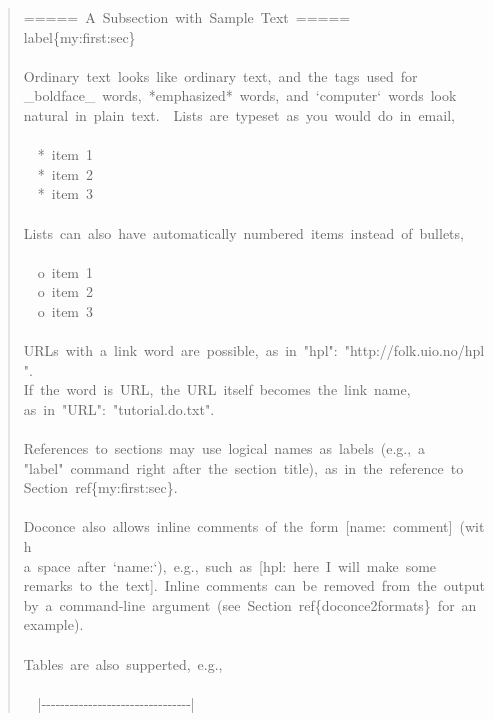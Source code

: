 \documentclass[a4paper]{article}
\begin{document}
\begin{quote}{\ttfamily \raggedright \noindent
=====~A~Subsection~with~Sample~Text~=====\\
label\{my:first:sec\}\\
~\\
Ordinary~text~looks~like~ordinary~text,~and~the~tags~used~for\\
\_boldface\_~words,~*emphasized*~words,~and~`computer`~words~look\\
natural~in~plain~text.~~Lists~are~typeset~as~you~would~do~in~email,\\
~\\
~~*~item~1\\
~~*~item~2\\
~~*~item~3\\
~\\
Lists~can~also~have~automatically~numbered~items~instead~of~bullets,\\
~\\
~~o~item~1\\
~~o~item~2\\
~~o~item~3\\
~\\
URLs~with~a~link~word~are~possible,~as~in~"hpl":~"http://folk.uio.no/hpl".\\
If~the~word~is~URL,~the~URL~itself~becomes~the~link~name,\\
as~in~"URL":~"tutorial.do.txt".\\
~\\
References~to~sections~may~use~logical~names~as~labels~(e.g.,~a\\
"label"~command~right~after~the~section~title),~as~in~the~reference~to\\
Section~ref\{my:first:sec\}.\\
~\\
Doconce~also~allows~inline~comments~of~the~form~{[}name:~comment{]}~(with\\
a~space~after~`name:`),~e.g.,~such~as~{[}hpl:~here~I~will~make~some\\
remarks~to~the~text{]}.~Inline~comments~can~be~removed~from~the~output\\
by~a~command-line~argument~(see~Section~ref\{doconce2formats\}~for~an\\
example).\\
~\\
Tables~are~also~supperted,~e.g.,\\
~\\
~~|-{}-{}-{}-{}-{}-{}-{}-{}-{}-{}-{}-{}-{}-{}-{}-{}-{}-{}-{}-{}-{}-{}-{}-{}-{}-{}-{}-{}-{}-{}-{}-|\\
}
\end{quote}
\end{document}
